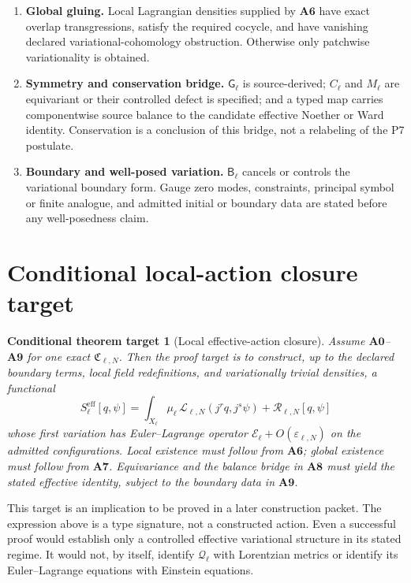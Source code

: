 \documentclass[11pt]{article}
\newtheorem{target}{Conditional theorem target}
\newcommand{\Qeff}{\mathcal Q_{\ell}}
\newcommand{\Eop}{\mathcal E_{\ell}}
\newcommand{\Seff}{S_{\ell}^{\mathrm{eff}}}
\newcommand{\Rem}{\mathcal R_{\ell,N}}
\begin{document}
\begin{enumerate}
\item[\(\mathbf{A7}\)] \textbf{Global gluing.}
Local Lagrangian densities supplied by \(\mathbf{A6}\) have exact overlap
transgressions, satisfy the required cocycle, and have vanishing declared
variational-cohomology obstruction.  Otherwise only patchwise
variationality is obtained.

\item[\(\mathbf{A8}\)] \textbf{Symmetry and conservation bridge.}
\(\mathsf G_\ell\) is source-derived; \(C_\ell\) and \(M_\ell\) are equivariant
or their controlled defect is specified; and a typed map carries
componentwise source balance to the candidate effective Noether or Ward
identity.  Conservation is a conclusion of this bridge, not a relabeling of
the P7 postulate.

\item[\(\mathbf{A9}\)] \textbf{Boundary and well-posed variation.}
\(\mathsf B_\ell\) cancels or controls the variational boundary form.  Gauge
zero modes, constraints, principal symbol or finite analogue, and admitted
initial or boundary data are stated before any well-posedness claim.
\end{enumerate}

\section{Conditional local-action closure target}

\begin{target}[Local effective-action closure]
Assume \(\mathbf{A0}\)--\(\mathbf{A9}\) for one exact
\(\mathfrak C_{\ell,N}\).  Then the proof target is to construct, up to the
declared boundary terms, local field redefinitions, and variationally trivial
densities, a functional
\[
 \Seff[q,\psi]
 =\int_{X_\ell}\mu_\ell\,
   \mathcal L_{\ell,N}
   (j^r q,j^s\psi)
   +\Rem[q,\psi]
\]
whose first variation has Euler--Lagrange operator
\(\Eop+O(\varepsilon_{\ell,N})\) on the admitted configurations.
Local existence must follow from \(\mathbf{A6}\); global existence must follow
from \(\mathbf{A7}\).  Equivariance and the balance bridge in
\(\mathbf{A8}\) must yield the stated effective identity, subject to the
boundary data in \(\mathbf{A9}\).
\end{target}

This target is an implication to be proved in a later construction packet.
The expression above is a type signature, not a constructed action.  Even a
successful proof would establish only a controlled effective variational
structure in its stated regime.  It would not, by itself, identify
\(\Qeff\) with Lorentzian metrics or identify its Euler--Lagrange equations
with Einstein equations.
\end{document}

